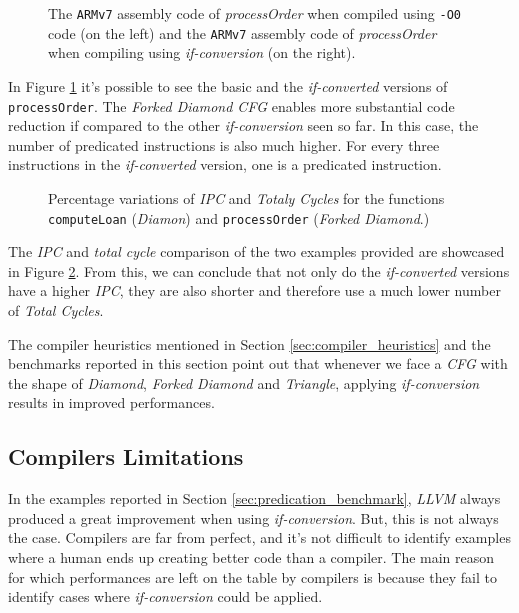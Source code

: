 \begin{figure}[H]
    \centering
    
    \caption[\texttt{ARMv7} Assembly Code of \textit{processOrder}]{The \texttt{ARMv7} assembly code of \textit{processOrder} when compiled using \texttt{-O0} code (on the left) and the \texttt{ARMv7} assembly code of \textit{processOrder} when compiling using \textit{if-conversion} (on the right).}
    \label{fig:process_order_asm}
\end{figure}

In Figure \ref{fig:process_order_asm} it's possible to see the basic and the \textit{if-converted} versions of \texttt{processOrder}. The \textit{Forked Diamond CFG} enables more substantial code reduction if compared to the other \textit{if-conversion} seen so far. In this case, the number of predicated instructions is also much higher. For every three instructions in the \textit{if-converted} version, one is a predicated instruction.

\begin{figure}[H]
    \centering
    
    \caption{Percentage variations of \textit{IPC} and \textit{Totaly Cycles} for the functions \texttt{computeLoan} (\textit{Diamon}) and \texttt{processOrder} (\textit{Forked Diamond}.)}
    \label{fig:benchmarks}
\end{figure}

The \textit{IPC} and \textit{total cycle} comparison of the two examples provided are showcased in Figure \ref{fig:benchmarks}. From this, we can conclude that not only do the \textit{if-converted} versions have a higher \textit{IPC}, they are also shorter and therefore use a much lower number of \textit{Total Cycles}. 

The compiler heuristics mentioned in Section \ref{sec:compiler_heuristics} and the benchmarks reported in this section point out that whenever we face a \textit{CFG} with the shape of \textit{Diamond}, \textit{Forked Diamond} and \textit{Triangle}, applying \textit{if-conversion} results in improved performances.

\subsection{Compilers Limitations}
\label{sec:limitations}
In the examples reported in Section \ref{sec:predication_benchmark}, \textit{LLVM} always produced a great improvement when using \textit{if-conversion}. But, this is not always the case. Compilers are far from perfect, and it's not difficult to identify examples where a human ends up creating better code than a compiler.
The main reason for which performances are left on the table by compilers is because they fail to identify cases where \textit{if-conversion} could be applied.

